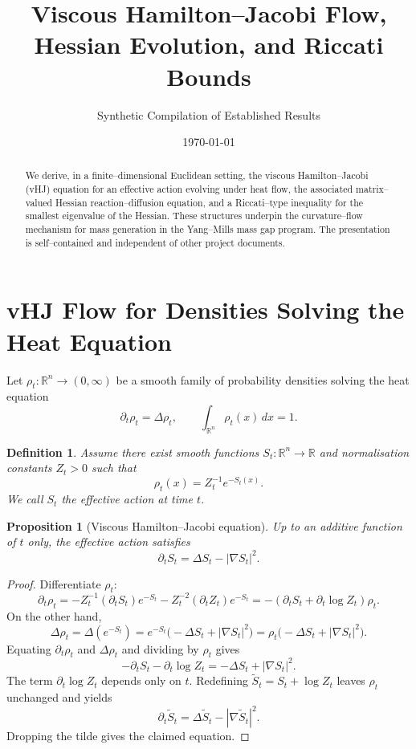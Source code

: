 \documentclass[11pt]{article}
\title{Viscous Hamilton--Jacobi Flow, Hessian Evolution, and Riccati Bounds}
\author{Synthetic Compilation of Established Results}
\date{\today}
\newtheorem{proposition}[theorem]{Proposition}
\newtheorem{definition}[theorem]{Definition}
\begin{document}
\maketitle

\begin{abstract}
We derive, in a finite--dimensional Euclidean setting, the viscous
Hamilton--Jacobi (vHJ) equation for an effective action evolving under
heat flow, the associated matrix--valued Hessian reaction--diffusion
equation, and a Riccati--type inequality for the smallest eigenvalue of
the Hessian.  These structures underpin the curvature--flow mechanism
for mass generation in the Yang--Mills mass gap program.  The
presentation is self--contained and independent of other project
documents.
\end{abstract}

\section{vHJ Flow for Densities Solving the Heat Equation}

Let $\rho_t:\mathbb{R}^n\to(0,\infty)$ be a smooth family of probability
densities solving the heat equation
\begin{equation}
  \partial_t\rho_t = \Delta\rho_t,
  \qquad \int_{\mathbb{R}^n}\rho_t(x)\,dx = 1.
\end{equation}

\begin{definition}
Assume there exist smooth functions $S_t:\mathbb{R}^n\to\mathbb{R}$ and
normalisation constants $Z_t>0$ such that
\begin{equation}
  \rho_t(x) = Z_t^{-1} e^{-S_t(x)}.
\end{equation}
We call $S_t$ the \emph{effective action} at time $t$.
\end{definition}

\begin{proposition}[Viscous Hamilton--Jacobi equation]
Up to an additive function of $t$ only, the effective action satisfies
\begin{equation}
  \partial_t S_t = \Delta S_t - |\nabla S_t|^2.
\end{equation}
\end{proposition}

\begin{proof}
Differentiate $\rho_t$:
\[
  \partial_t\rho_t
  = -Z_t^{-1}(\partial_t S_t)e^{-S_t}
    - Z_t^{-2}(\partial_t Z_t)e^{-S_t}
  = -(\partial_t S_t + \partial_t\log Z_t)\rho_t.
\]
On the other hand,
\[
  \Delta\rho_t
  = \Delta(e^{-S_t})
  = e^{-S_t}\big(-\Delta S_t + |\nabla S_t|^2\big)
  = \rho_t\big(-\Delta S_t + |\nabla S_t|^2\big).
\]
Equating $\partial_t\rho_t$ and $\Delta\rho_t$ and dividing by $\rho_t$
gives
\[
  -\partial_t S_t - \partial_t\log Z_t
  = -\Delta S_t + |\nabla S_t|^2.
\]
The term $\partial_t\log Z_t$ depends only on $t$.  Redefining
$\tilde S_t = S_t + \log Z_t$ leaves $\rho_t$ unchanged and yields
\[
  \partial_t\tilde S_t
  = \Delta\tilde S_t - |\nabla\tilde S_t|^2.
\]
Dropping the tilde gives the claimed equation.
\end{proof}
\end{document}
